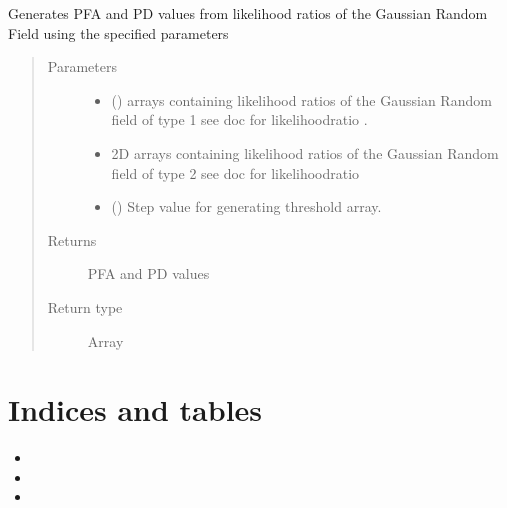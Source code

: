 \documentclass[letterpaper,10pt,english]{sphinxmanual}
\begin{document}
\begin{fulllineitems}
\label{\detokenize{rocGen:rocGen.LikelihoodROC}}
\sphinxAtStartPar
Generates PFA and PD values from likelihood ratios of the Gaussian Random Field using the specified parameters
\begin{quote}\begin{description}
\item[{Parameters}] \leavevmode\begin{itemize}
\item {} 
\sphinxAtStartPar
{} () \textendash{} arrays containing likelihood ratios of the Gaussian Random field of type 1 see doc for likelihoodratio .

\item {} 
\sphinxAtStartPar
{} \textendash{} 2\sphinxhyphen{}D arrays containing likelihood ratios of the Gaussian Random field of type 2 see doc for likelihoodratio

\item {} 
\sphinxAtStartPar
{} () \textendash{} Step value for generating threshold array.

\end{itemize}

\item[{Returns}] \leavevmode
\sphinxAtStartPar
PFA and PD values

\item[{Return type}] \leavevmode
\sphinxAtStartPar
Array

\end{description}\end{quote}

\end{fulllineitems}



\chapter{Indices and tables}
\label{\detokenize{index:indices-and-tables}}\begin{itemize}
\item {} 
\sphinxAtStartPar
{}

\item {} 
\sphinxAtStartPar
{}

\item {} 
\sphinxAtStartPar
{}

\end{itemize}
\end{document}
